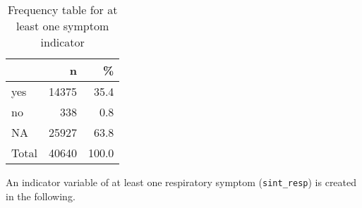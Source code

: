 \documentclass[
]{article}
\begin{document}
\begin{table}[!h]

\caption{\label{tab:unnamed-chunk-81}Frequency table for at least one symptom indicator}
\centering
\begin{tabular}[t]{l|r|r}
\hline
  & n & \%\\
\hline
yes & 14375 & 35.4\\
\hline
no & 338 & 0.8\\
\hline
NA & 25927 & 63.8\\
\hline
Total & 40640 & 100.0\\
\hline
\end{tabular}
\end{table}

An indicator variable of at least one respiratory symptom
(\texttt{sint\_resp}) is created in the following.
\end{document}

